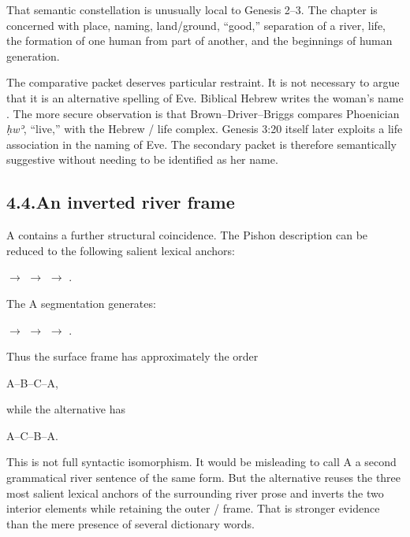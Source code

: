 That semantic constellation is unusually local to Genesis 2--3.  The chapter is concerned with place, naming, land/ground, ``good,'' separation of a river, life, the formation of one human from part of another, and the beginnings of human generation.

The comparative packet  deserves particular restraint.  It is not necessary to argue that it is an alternative spelling of Eve.  Biblical Hebrew writes the woman's name .  The more secure observation is that Brown--Driver--Briggs compares Phoenician \textit{ḥwʾ}, ``live,'' with the Hebrew / life complex.\cite{BDB}  Genesis 3:20 itself later exploits a life association in the naming of Eve.  The secondary packet is therefore semantically suggestive without needing to be identified as her name.

\subsection*{4.4.\quad An inverted river frame}

A contains a further structural coincidence.  The Pishon description can be reduced to the following salient lexical anchors:

\begin{center}
 \quad $\rightarrow$ \quad {} \quad $\rightarrow$ \quad {} \quad $\rightarrow$ \quad {}.
\end{center}

The A segmentation generates:

\begin{center}
 \quad $\rightarrow$ \quad {} \quad $\rightarrow$ \quad {} \quad $\rightarrow$ \quad {}.
\end{center}

Thus the surface frame has approximately the order

\begin{center}
A--B--C--A,
\end{center}

while the alternative has

\begin{center}
A--C--B--A.
\end{center}

This is not full syntactic isomorphism.  It would be misleading to call A a second grammatical river sentence of the same form.  But the alternative reuses the three most salient lexical anchors of the surrounding river prose and inverts the two interior elements while retaining the outer / frame.  That is stronger evidence than the mere presence of several dictionary words.


